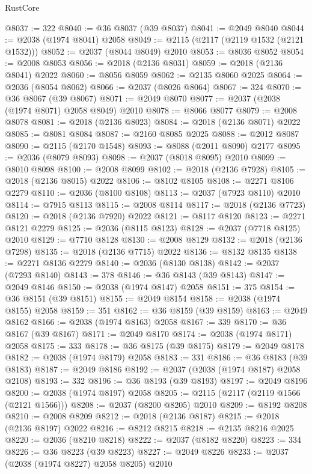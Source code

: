\begin{lexlean}{RustCore}
\begin{coremodule}
@8037 := 322
@8040 := @36 @8037 (@39 @8037)
@8041 := @2049 @8040
@8044 := @2038 (@1974 @8041) @2058
@8049 := @2115 (@2117 (@2119 @1532 (@2121 @1532)))
@8052 := @2037 (@8044 @8049) @2010
@8053 := @8036 @8052
@8054 := @2008 @8053
@8056 := @2018 (@2136 @8031)
@8059 := @2018 (@2136 @8041) @2022
@8060 := @8056 @8059
@8062 := @2135 @8060 @2025
@8064 := @2036 (@8054 @8062)
@8066 := @2037 (@8026 @8064)
@8067 := 324
@8070 := @36 @8067 (@39 @8067)
@8071 := @2049 @8070
@8077 := @2037 (@2038 (@1974 @8071) @2058 @8049) @2010
@8078 := @8066 @8077
@8079 := @2008 @8078
@8081 := @2018 (@2136 @8023)
@8084 := @2018 (@2136 @8071) @2022
@8085 := @8081 @8084
@8087 := @2160 @8085 @2025
@8088 := @2012 @8087
@8090 := @2115 (@2170 @1548)
@8093 := @8088 (@2011 @8090) @2177
@8095 := @2036 (@8079 @8093)
@8098 := @2037 (@8018 @8095) @2010
@8099 := @8010 @8098
@8100 := @2008 @8099
@8102 := @2018 (@2136 @7928)
@8105 := @2018 (@2136 @8015) @2022
@8106 := @8102 @8105
@8108 := @2271 @8106 @2279
@8110 := @2036 (@8100 @8108)
@8113 := @2037 (@7923 @8110) @2010
@8114 := @7915 @8113
@8115 := @2008 @8114
@8117 := @2018 (@2136 @7723)
@8120 := @2018 (@2136 @7920) @2022
@8121 := @8117 @8120
@8123 := @2271 @8121 @2279
@8125 := @2036 (@8115 @8123)
@8128 := @2037 (@7718 @8125) @2010
@8129 := @7710 @8128
@8130 := @2008 @8129
@8132 := @2018 (@2136 @7298)
@8135 := @2018 (@2136 @7715) @2022
@8136 := @8132 @8135
@8138 := @2271 @8136 @2279
@8140 := @2036 (@8130 @8138)
@8142 := @2037 (@7293 @8140)
@8143 := 378
@8146 := @36 @8143 (@39 @8143)
@8147 := @2049 @8146
@8150 := @2038 (@1974 @8147) @2058
@8151 := 375
@8154 := @36 @8151 (@39 @8151)
@8155 := @2049 @8154
@8158 := @2038 (@1974 @8155) @2058
@8159 := 351
@8162 := @36 @8159 (@39 @8159)
@8163 := @2049 @8162
@8166 := @2038 (@1974 @8163) @2058
@8167 := 339
@8170 := @36 @8167 (@39 @8167)
@8171 := @2049 @8170
@8174 := @2038 (@1974 @8171) @2058
@8175 := 333
@8178 := @36 @8175 (@39 @8175)
@8179 := @2049 @8178
@8182 := @2038 (@1974 @8179) @2058
@8183 := 331
@8186 := @36 @8183 (@39 @8183)
@8187 := @2049 @8186
@8192 := @2037 (@2038 (@1974 @8187) @2058 @2108)
@8193 := 332
@8196 := @36 @8193 (@39 @8193)
@8197 := @2049 @8196
@8200 := @2038 (@1974 @8197) @2058
@8205 := @2115 (@2117 (@2119 @1566 (@2121 @1566)))
@8208 := @2037 (@8200 @8205) @2010
@8209 := @8192 @8208
@8210 := @2008 @8209
@8212 := @2018 (@2136 @8187)
@8215 := @2018 (@2136 @8197) @2022
@8216 := @8212 @8215
@8218 := @2135 @8216 @2025
@8220 := @2036 (@8210 @8218)
@8222 := @2037 (@8182 @8220)
@8223 := 334
@8226 := @36 @8223 (@39 @8223)
@8227 := @2049 @8226
@8233 := @2037 (@2038 (@1974 @8227) @2058 @8205) @2010

\end{coremodule}
\end{lexlean}
